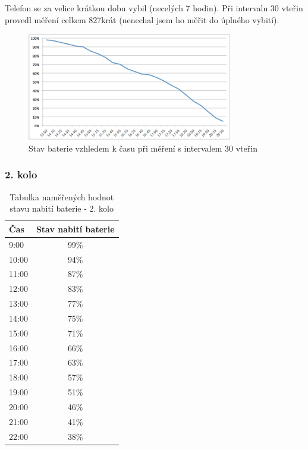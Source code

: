 Telefon se za velice krátkou dobu vybil (necelých 7 hodin). Při intervalu 30 vteřin provedl měření celkem 827krát (nenechal jsem ho měřit do úplného vybití).

\newpage

\begin{figure}[h]
	\centering
	\includegraphics[width=0.8\textwidth]{figures/04_testing/graph30.jpg}
	\caption{Stav baterie vzhledem k času při měření s intervalem 30 vteřin}
	\label{batt1}
\end{figure}

\subsubsection*{2. kolo}
\begin{table}[h]
	\begin{center}
		\begin{tabular}{|l|c|}
			\hline
				{\bf Čas} & {\bf Stav nabití baterie}\\
			\hline \hline
				9:00 & 99\%\\
				\hline
				10:00 & 94\%\\
				\hline
				11:00 & 87\%\\
				\hline
				12:00 & 83\%\\
				\hline
				13:00 & 77\%\\
				\hline
				14:00 & 75\%\\
				\hline
				15:00 & 71\%\\
				\hline
				16:00 & 66\%\\
				\hline
				17:00 & 63\%\\
				\hline
				18:00 & 57\%\\
				\hline
				19:00 & 51\%\\
				\hline
				20:00 & 46\%\\
				\hline
				21:00 & 41\%\\
				\hline
				22:00 & 38\%\\
				\hline
		\end{tabular}
	\end{center}
	\caption{Tabulka naměřených hodnot stavu nabití baterie - 2. kolo}
	\label{tab.15m}
\end{table}

